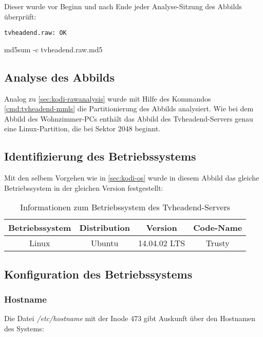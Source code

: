 Dieser wurde vor Beginn und nach Ende jeder Analyse-Sitzung des Abbilds überprüft:

\begin{cmd}
\begin{verbatim}
tvheadend.raw: OK
\end{verbatim}
\caption{md5sum -c tvheadend.raw.md5}
\end{cmd}

\subsection{Analyse des Abbilds}

Analog zu \autoref{sec:kodi-rawanalysis} wurde mit Hilfe des Kommandos \autoref{cmd:tvheadend-mmls} die Partitionierung des Abbilds analysiert. Wie bei dem Abbild des Wohnzimmer-PCs enthält das Abbild des Tvheadend-Servers genau eine Linux-Partition, die bei Sektor 2048 beginnt.

\subsection{Identifizierung des Betriebssystems}
\label{sec:tvheadend-os}

Mit den selbem Vorgehen wie in \autoref{sec:kodi-os} wurde in diesem Abbild das gleiche Betriebssystem in der gleichen Version festgestellt:

\begin{table}[H]
\centering
\begin{tabular}{cccc}
\toprule
Betriebssystem & Distribution & Version & Code-Name \\ 
\midrule
Linux & Ubuntu & 14.04.02 LTS & Trusty \\ 
\bottomrule
\end{tabular} 
\caption{Informationen zum Betriebssystem des Tvheadend-Servers}
\label{table:tvheadend-os}
\end{table}

\subsection{Konfiguration des Betriebssystems}

\subsubsection{Hostname}
\label{sec:tvheadend-hostname}

Die Datei \textit{/etc/hostname} mit der Inode 473 gibt Auskunft über den Hostnamen des Systems:

